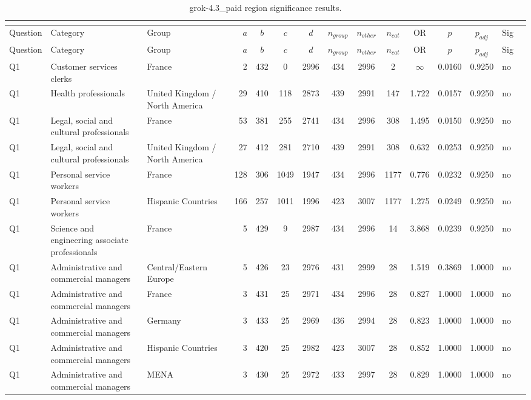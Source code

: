 \begin{longtable}{lllrcccccccccll}
\caption{grok-4.3_paid region significance results.}\\
\label{tab:appendix-grok-4.3_paid-region}\\
\toprule
Question & Category & Group & $a$ & $b$ & $c$ & $d$ & $n_{group}$ & $n_{other}$ & $n_{cat}$ & OR & $p$ & $p_{adj}$ & Sig \\
\midrule
\endfirsthead
\toprule
Question & Category & Group & $a$ & $b$ & $c$ & $d$ & $n_{group}$ & $n_{other}$ & $n_{cat}$ & OR & $p$ & $p_{adj}$ & Sig \\
\midrule
\endhead
\midrule
\endfoot
\bottomrule
\endlastfoot
Q1 & Customer services clerks & France & 2 & 432 & 0 & 2996 & 434 & 2996 & 2 & $\infty$ & 0.0160 & 0.9250 & no \\
Q1 & Health professionals & United Kingdom / North America & 29 & 410 & 118 & 2873 & 439 & 2991 & 147 & 1.722 & 0.0157 & 0.9250 & no \\
Q1 & Legal, social and cultural professionals & France & 53 & 381 & 255 & 2741 & 434 & 2996 & 308 & 1.495 & 0.0150 & 0.9250 & no \\
Q1 & Legal, social and cultural professionals & United Kingdom / North America & 27 & 412 & 281 & 2710 & 439 & 2991 & 308 & 0.632 & 0.0253 & 0.9250 & no \\
Q1 & Personal service workers & France & 128 & 306 & 1049 & 1947 & 434 & 2996 & 1177 & 0.776 & 0.0232 & 0.9250 & no \\
Q1 & Personal service workers & Hispanic Countries & 166 & 257 & 1011 & 1996 & 423 & 3007 & 1177 & 1.275 & 0.0249 & 0.9250 & no \\
Q1 & Science and engineering associate professionals & France & 5 & 429 & 9 & 2987 & 434 & 2996 & 14 & 3.868 & 0.0239 & 0.9250 & no \\
Q1 & Administrative and commercial managers & Central/Eastern Europe & 5 & 426 & 23 & 2976 & 431 & 2999 & 28 & 1.519 & 0.3869 & 1.0000 & no \\
Q1 & Administrative and commercial managers & France & 3 & 431 & 25 & 2971 & 434 & 2996 & 28 & 0.827 & 1.0000 & 1.0000 & no \\
Q1 & Administrative and commercial managers & Germany & 3 & 433 & 25 & 2969 & 436 & 2994 & 28 & 0.823 & 1.0000 & 1.0000 & no \\
Q1 & Administrative and commercial managers & Hispanic Countries & 3 & 420 & 25 & 2982 & 423 & 3007 & 28 & 0.852 & 1.0000 & 1.0000 & no \\
Q1 & Administrative and commercial managers & MENA & 3 & 430 & 25 & 2972 & 433 & 2997 & 28 & 0.829 & 1.0000 & 1.0000 & no \\

\end{longtable}
